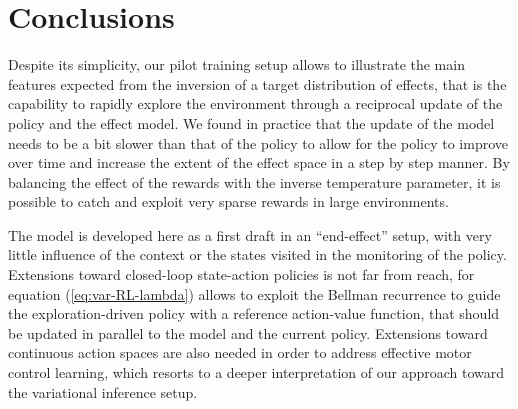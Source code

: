 \documentclass[runningheads]{llncs}
\begin{document}




\section{Conclusions}

Despite its simplicity, our pilot training setup allows to illustrate the main features expected from the inversion of a target distribution of effects, that is the capability to rapidly explore the environment through a reciprocal update of the policy and the effect model. We found in practice that the update of the model needs to be a bit slower than that of the policy to allow for the policy to improve over time and increase the extent of the effect space in a step by step manner. By balancing the effect of the rewards with the inverse temperature parameter, it is possible to catch and exploit very sparse rewards in large environments. 

The model is developed here as a first draft in an ``end-effect'' setup, with very little influence of the context or the states visited in the monitoring of the policy. Extensions toward closed-loop state-action policies is not far from reach, for equation (\ref{eq:var-RL-lambda}) allows to exploit the Bellman recurrence to guide the exploration-driven policy with a reference action-value function, that should be updated in parallel to the model and the current policy. Extensions toward continuous action spaces are also needed in order to address effective motor control learning, which resorts to a deeper interpretation of our approach toward the variational inference setup. 
%
%
%


%
\end{document}
